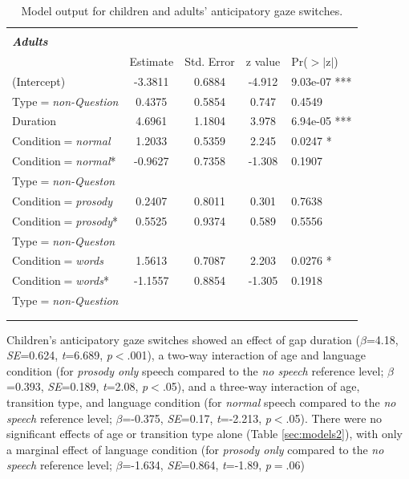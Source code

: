 \documentclass[authoryear, 12pt]{elsarticle}
\begin{document}
\begin{footnotesize}
\begin{longtable}{lcccl}
    \hline
  &&&& \\
  \textbf{\textit{Adults}} &&&& \\
    \hline
                       &  Estimate & Std. Error & z value & Pr($>$$|$z$|$) \\    
    \hline
    (Intercept)						& -3.3811		& 0.6884		& -4.912	& 9.03e-07 *** 		\\ 
    Type$=$\textit{non-Question}		& 0.4375		& 0.5854		& 0.747	& 0.4549     		\\ 
    Duration						& 4.6961		& 1.1804		& 3.978	& 6.94e-05 *** 		\\ 
	\hline
    Condition$=$\textit{normal}			& 1.2033		& 0.5359		& 2.245	& 0.0247 *   		\\ 
    Condition$=$\textit{normal}*			& -0.9627		& 0.7358		& -1.308	& 0.1907     		\\ 
    \hspace*{5mm} Type$=$\textit{non-Queston} &&&& \\
	\hline
    Condition$=$\textit{prosody}			& 0.2407		& 0.8011		& 0.301	& 0.7638     		\\ 
    Condition$=$\textit{prosody}*		& 0.5525		& 0.9374		& 0.589	& 0.5556     		\\ 
    \hspace*{5mm} Type$=$\textit{non-Queston} &&&& \\
	\hline
    Condition$=$\textit{words}			& 1.5613		& 0.7087		& 2.203	& 0.0276 *   		\\ 
    Condition$=$\textit{words}*			& -1.1557		& 0.8854		& -1.305	& 0.1918     		\\ 
    \hspace*{5mm} Type$=$\textit{non-Question} &&&& \\
    \hline
    &&&& \\
  \caption{Model output for children and adults' anticipatory gaze switches.}
\label{tab:E2-models}
\end{longtable}
\end{footnotesize}

Children's anticipatory gaze switches showed an effect of gap duration (\textit{$\beta$}=4.18, \textit{SE}=0.624, \textit{t}=6.689, \textit{p}$<$.001), a two-way interaction of age and language condition (for \textit{prosody only} speech compared to the \textit{no speech} reference level; \textit{$\beta$}=0.393, \textit{SE}=0.189, \textit{t}=2.08, \textit{p}$<$.05), and a three-way interaction of age, transition type, and language condition (for \textit{normal} speech compared to the \textit{no speech} reference level; \textit{$\beta$}=-0.375, \textit{SE}=0.17, \textit{t}=-2.213, \textit{p}$<$.05). There were no significant effects of age or transition type alone (Table \ref{sec:models2}), with only a marginal effect of language condition (for \textit{prosody only} compared to the \textit{no speech} reference level; \textit{$\beta$}=-1.634, \textit{SE}=0.864, \textit{t}=-1.89, \textit{p}$=$.06)
\end{document}
